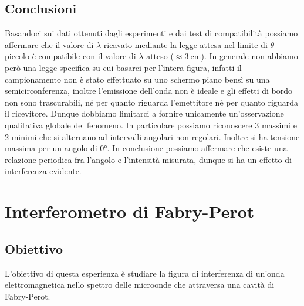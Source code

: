 \documentclass[a4paper]{article}
\begin{document}
\subsection{Conclusioni}
Basandoci sui dati ottenuti dagli esperimenti e dai test di compatibilità possiamo affermare che il valore di $\lambda$ ricavato mediante la legge attesa nel limite di $\theta$ piccolo è compatibile con il valore di $\lambda$ atteso ($\approx \SI{3}{\centi\metre}$). In generale non abbiamo però una legge specifica su cui basarci per l'intera figura, infatti il campionamento non è stato effettuato su uno schermo piano bensì su una semicirconferenza, inoltre l'emissione dell'onda non è ideale e gli effetti di bordo non sono trascurabili, né per quanto riguarda l'emettitore né per quanto riguarda il ricevitore. Dunque dobbiamo limitarci a fornire unicamente un'osservazione qualitativa globale del fenomeno. In particolare possiamo riconoscere 3 massimi e 2 minimi che si alternano ad intervalli angolari non regolari. Inoltre si ha tensione massima per un angolo di $\ang{0}$. In conclusione possiamo affermare che esiste una relazione periodica fra l'angolo e l'intensità misurata, dunque si ha un effetto di interferenza evidente.

\section{Interferometro di Fabry-Perot}
\subsection{Obiettivo}
L'obiettivo di questa esperienza è studiare la figura di interferenza di un'onda elettromagnetica nello spettro delle microonde che attraversa una cavità di Fabry-Perot.
\end{document}
